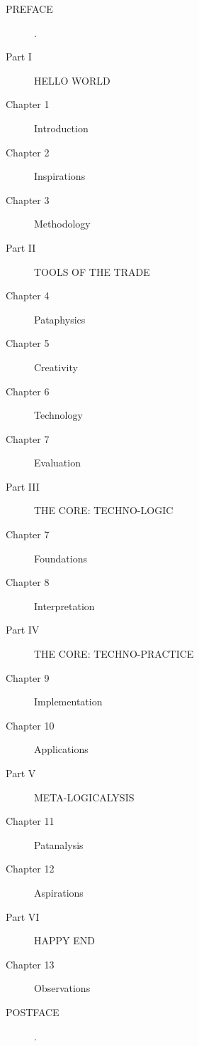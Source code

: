 \begin{description}
  \item[PREFACE] .
  \item[Part I] HELLO WORLD
  \item[Chapter 1] Introduction
  \item[Chapter 2] Inspirations
  \item[Chapter 3] Methodology
  \item[Part II] TOOLS OF THE TRADE
  \item[Chapter 4] Pataphysics
  \item[Chapter 5] Creativity
  \item[Chapter 6] Technology
  \item[Chapter 7] Evaluation
  \item[Part III] THE CORE: TECHNO-LOGIC
  \item[Chapter 7] Foundations
  \item[Chapter 8] Interpretation
  \item[Part IV] THE CORE: TECHNO-PRACTICE
  \item[Chapter 9] Implementation
  \item[Chapter 10] Applications
  \item[Part V] META-LOGICALYSIS
  \item[Chapter 11] Patanalysis
  \item[Chapter 12] Aspirations
  \item[Part VI] HAPPY END
  \item[Chapter 13] Observations
  \item[POSTFACE] .
\end{description}


\stopcontents[chapters]
